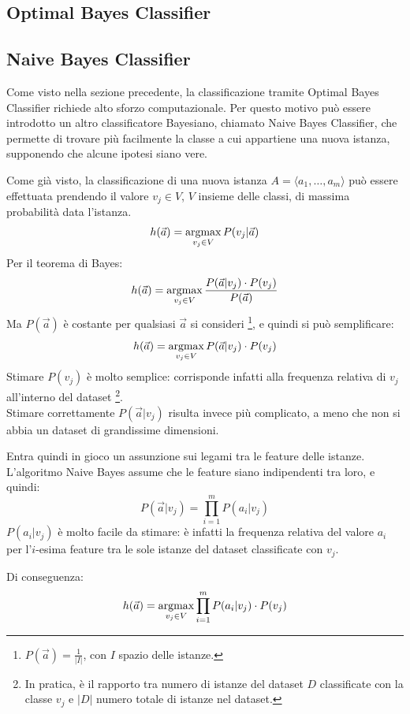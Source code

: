 \subsection{Optimal Bayes Classifier}

\subsection{Naive Bayes Classifier}
Come visto nella sezione precedente, la classificazione tramite Optimal Bayes Classifier richiede alto sforzo computazionale.
Per questo motivo può essere introdotto un altro classificatore Bayesiano, chiamato Naive Bayes Classifier, che permette di trovare più facilmente la classe a cui appartiene una nuova istanza, supponendo che alcune ipotesi siano vere.

Come già visto, la classificazione di una nuova istanza $A = \langle a_1, \ldots, a_m \rangle$ può essere effettuata prendendo il valore $v_j \in V$, $V$ insieme delle classi, di massima probabilità data l'istanza.
\[
    h(\Vec{a}) = \operatorname*{argmax}_{v_j \in V} P(v_j | \Vec{a})
\]
Per il teorema di Bayes:
\[
    h(\Vec{a}) = \operatorname*{argmax}\limits_{v_j \in V} \frac{P(\Vec{a} | v_j) \cdot P(v_j)}{P(\Vec{a})}
\]
Ma $P(\Vec{a})$ è costante per qualsiasi $\Vec{a}$ si consideri \footnote{$P(\Vec{a}) = \frac{1}{|I|}$, con $I$ spazio delle istanze.}, e quindi si può semplificare:
\[
    h(\Vec{a}) = \operatorname*{argmax}\limits_{v_j \in V} P(\Vec{a} | v_j) \cdot P(v_j)
\]
Stimare $P(v_j)$ è molto semplice: corrisponde infatti alla frequenza relativa di $v_j$ all'interno del dataset \footnote{In pratica, è il rapporto tra numero di istanze del dataset $D$ classificate con la classe $v_j$ e $|D|$ numero totale di istanze nel dataset.}.\\
Stimare correttamente $P(\Vec{a} | v_j)$ risulta invece più complicato, a meno che non si abbia un dataset di grandissime dimensioni.

Entra quindi in gioco un assunzione sui legami tra le feature delle istanze. L'algoritmo Naive Bayes assume che le feature siano indipendenti tra loro, e quindi:
\[
    P(\Vec{a} | v_j) = \prod\limits_{i=1}^m P(a_i | v_j) 
\]
$P(a_i | v_j)$ è molto facile da stimare: è infatti la frequenza relativa del valore $a_i$ per l'$i$-esima feature tra le sole istanze del dataset classificate con $v_j$.

Di conseguenza:
\[
    h(\Vec{a}) = \operatorname*{argmax}\limits_{v_j \in V} \prod\limits_{i=1}^m P(a_i | v_j)  \cdot P(v_j)
\]

